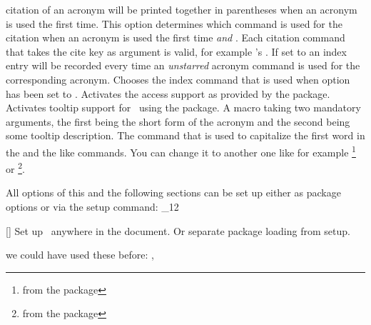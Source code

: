 \documentclass[load-preamble+]{cnltx-doc}
\makeatletter
\renewenvironment{commands}
  {%
    \cnltx@set@catcode_{12}%
    \let\command\cnltx@command
    \cnltxlist
  }
  {\endcnltxlist}
\makeatother
\begin{document}
\begin{options}
    citation of an acronym will be printed together in parentheses when an
    acronym is used the first time.
    This option determines which command is used for the
    citation when an acronym is used the first time \emph{and}
    .  Each citation command that takes the cite
    key as argument is valid, for example 's .
    If set to  an index entry will be recorded
    every time an \emph{unstarred} acronym command is used for the
    corresponding acronym.
    Chooses the index command that is used when option
     has been set to .
    Activates the access support as provided by the
     package.
    Activates tooltip support for \acro\ using the
     package.
    A macro taking two mandatory arguments, the first being
    the short form of the acronym and the second being some tooltip
    description.
    The command that is used to capitalize the first word in the  and
    the like commands.  You can change it to another one like for example
    \footnote{from the  package} or
    \footnote{from the  package}.
\end{options}
 
All options of this and the following sections can be set up either as package
options or via the setup command:
\begin{commands}
  \command{acsetup}[]
   Set up \acro\ anywhere in the document.  Or separate package loading from
   setup.
\end{commands}

\begin{example}
  we could have used these before: \nato, \ny
\end{example}
\end{document}
